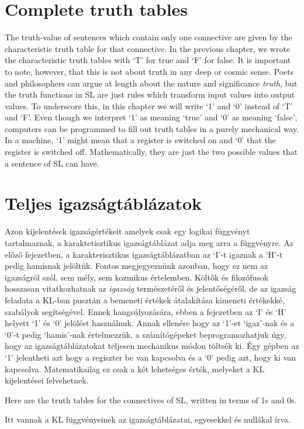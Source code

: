 \section*{Complete truth tables}
The truth-value of sentences which contain only one connective are given by the characteristic truth table for that connective. In the previous chapter, we wrote the characteristic truth tables with `T' for true and `F' for false. It is important to note, however, that this is not about truth in any deep or cosmic sense. Poets and philosophers can argue at length about the nature and significance \emph{truth}, but the truth functions in SL are just rules which transform input values into output values. To underscore this, in this chapter we will write `1' and `0' instead of `T' and `F'. Even though we interpret `1' as meaning `true' and `0' as meaning `false', computers can be programmed to fill out truth tables in a purely mechanical way. In a machine, `1' might mean that a register is switched on and `0' that the register is switched off. Mathematically, they are just the two possible values that a sentence of SL can have.

\section{Teljes igazságtáblázatok}
Azon kijelentések igazságértékeit amelyek csak egy logikai függvényt tartalmaznak, a karaktetisztikus igazságtáblázat adja meg arra a függvényre. Az előző fejezetben, a karakterisztikus igazságtáblázatban az `I'-t igaznak a `H'-t pedig hamisnak jelöltük. Fontos megjegyeznünk azonban, hogy ez nem az igazságról szól, sem mély, sem kozmikus értelemben. Költők és filozófusok hosszasan vitatkozhatnak az \emph{igazság} természetéről és jelentőségéről, de az igazság feladata a KL-ban pusztán a bemeneti értékek átalakítása kimeneti értékekké, szabályok segítségével. Ennek hangsúlyozására, ebben a fejezetben az `I' és `H' helyett `1' és `0' jelölést használnuk. Annak ellenére hogy az `1'-et `igaz'-nak és a `0'-t pedig `hamis'-nak értelmezzük, a számítógépeket beprogramozhatjuk úgy, hogy az igazságtáblázatokat teljesen mechanikus módon töltsék ki. Égy gépben az `1' jelentheti azt hogy a regiszter be van kapcsolva és a `0' pedig azt, hogy ki van kapcsolva. Matematikailag ez csak a két lehetséges érték, melyeket a KL kijelentései felvehetnek.


Here are the truth tables for the connectives of SL, written in terms of 1s and 0s.

Itt vannak a KL függvényeinek az igazságtáblázatai, egyesekkel és nullákal írva. 

